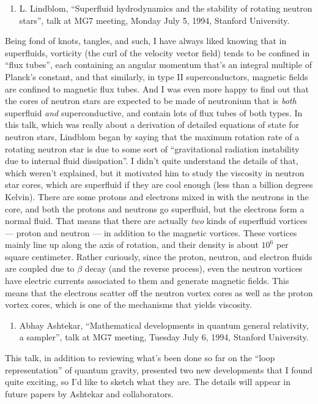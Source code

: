 \documentclass[12pt]{article}
\def\tightlist{}
\begin{document}
\begin{enumerate}
\def\labelenumi{\arabic{enumi})}
\tightlist
\item
  L. Lindblom, ``Superfluid hydrodynamics and the stability of rotating
  neutron stars'', talk at MG7 meeting, Monday July 5, 1994, Stanford
  University.
\end{enumerate}

Being fond of knots, tangles, and such, I have always liked knowing that
in superfluids, vorticity (the curl of the velocity vector field) tends
to be confined in ``flux tubes'', each containing an angular momentum
that's an integral multiple of Planck's constant, and that similarly, in
type II superconductors, magnetic fields are confined to magnetic flux
tubes. And I was even more happy to find out that the cores of neutron
stars are expected to be made of neutronium that is \emph{both}
superfluid \emph{and} superconductive, and contain lots of flux tubes of
both types. In this talk, which was really about a derivation of
detailed equations of state for neutron stars, Lindblom began by saying
that the maximum rotation rate of a rotating neutron star is due to some
sort of ``gravitational radiation instability due to internal fluid
dissipation''. I didn't quite understand the details of that, which
weren't explained, but it motivated him to study the viscosity in
neutron star cores, which are superfluid if they are cool enough (less
than a billion degrees Kelvin). There are some protons and electrons
mixed in with the neutrons in the core, and both the protons and
neutrons go superfluid, but the electrons form a normal fluid. That
means that there are actually \emph{two} kinds of superfluid vortices
--- proton and neutron --- in addition to the magnetic vortices. These
vortices mainly line up along the axis of rotation, and their density is
about \(10^6\) per square centimeter. Rather curiously, since the
proton, neutron, and electron fluids are coupled due to \(\beta\) decay
(and the reverse process), even the neutron vortices have electric
currents associated to them and generate magnetic fields. This means
that the electrons scatter off the neutron vortex cores as well as the
proton vortex cores, which is one of the mechanisms that yields
viscosity.

\begin{enumerate}
\def\labelenumi{\arabic{enumi})}
\setcounter{enumi}{1}
\tightlist
\item
  Abhay Ashtekar, ``Mathematical developments in quantum general
  relativity, a sampler'', talk at MG7 meeting, Tuesday July 6, 1994,
  Stanford University.
\end{enumerate}
\noindent
This talk, in addition to reviewing what's been done so far on the
``loop representation'' of quantum gravity, presented two new
developments that I found quite exciting, so I'd like to sketch what
they are. The details will appear in future papers by Ashtekar and
collaborators.
\end{document}
